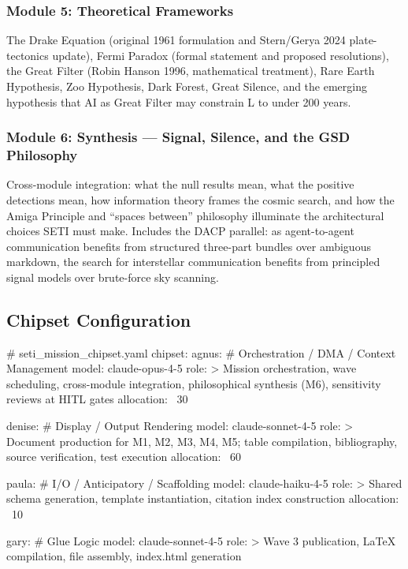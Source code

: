 \documentclass[11pt,letterpaper]{article}
\begin{document}
\subsubsection{Module 5: Theoretical Frameworks}
The Drake Equation (original 1961 formulation and Stern/Gerya 2024 plate-tectonics update), Fermi Paradox (formal statement and proposed resolutions), the Great Filter (Robin Hanson 1996, mathematical treatment), Rare Earth Hypothesis, Zoo Hypothesis, Dark Forest, Great Silence, and the emerging hypothesis that AI as Great Filter may constrain L to under 200 years.

\subsubsection{Module 6: Synthesis --- Signal, Silence, and the GSD Philosophy}
Cross-module integration: what the null results mean, what the positive detections mean, how information theory frames the cosmic search, and how the Amiga Principle and ``spaces between'' philosophy illuminate the architectural choices SETI must make. Includes the DACP parallel: as agent-to-agent communication benefits from structured three-part bundles over ambiguous markdown, the search for interstellar communication benefits from principled signal models over brute-force sky scanning.

\subsection{Chipset Configuration}

\begin{asciibox}
# seti_mission_chipset.yaml
chipset:
  agnus:             # Orchestration / DMA / Context Management
    model: claude-opus-4-5
    role: >
      Mission orchestration, wave scheduling, cross-module
      integration, philosophical synthesis (M6), sensitivity
      reviews at HITL gates
    allocation: ~30%

  denise:            # Display / Output Rendering
    model: claude-sonnet-4-5
    role: >
      Document production for M1, M2, M3, M4, M5;
      table compilation, bibliography, source verification,
      test execution
    allocation: ~60%

  paula:             # I/O / Anticipatory / Scaffolding
    model: claude-haiku-4-5
    role: >
      Shared schema generation, template instantiation,
      citation index construction
    allocation: ~10%

  gary:              # Glue Logic
    model: claude-sonnet-4-5
    role: >
      Wave 3 publication, LaTeX compilation, file assembly,
      index.html generation
\end{asciibox}
\end{document}
